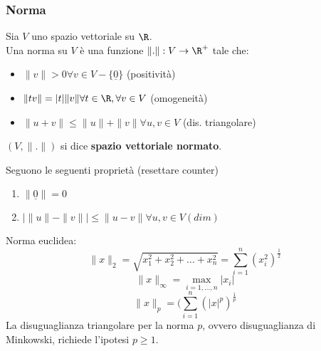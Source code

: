 \subsubsection{Norma}
\begin{tcolorbox}
	Sia $V$ uno spazio vettoriale su $\R$.
	\\Una norma su $V$ è una funzione $\|.\|:V\to \R^+$ tale che:
	\begin{itemize}
		\item $\|v\|>0\forall v\in V-\{\underline 0\} $ (positività)
		\item $\|tv\|=|t|\|v\|\forall t\in\R,\forall v\in V$ (omogeneità)
		\item $\|u+v\|\le \|u\|+\|v\|\forall u,v\in V$ (dis. triangolare)
	\end{itemize}
\end{tcolorbox}
\begin{tcolorbox}
	$(V,\|.\|)$ si dice \textbf{spazio vettoriale normato}.
\end{tcolorbox}
Seguono le seguenti proprietà (resettare counter)
\begin{enumerate}
	\item $\|\underline 0\|=0$
	\item $| \|u\|-\|v\| |\le \|u-v\|\forall u,v\in V (dim)$
\end{enumerate}
Norma euclidea:
\[\|x\|_2=\sqrt{x_1^2+x_2^2+\ldots+x_n^2} =\sum_{i=1}^{n} (x_i^2)^\frac{1}{2}\]
\[\|x\|_\infty=\max_{i=1,\ldots,n}|x_i|\]
\[\|x\|_p=(\sum_{i=1}^{n}(|x|^p)^{\frac{1}{p}}\]
La disuguaglianza triangolare per la norma $p$, ovvero disuguaglianza di Minkowski, richiede l'ipotesi $p\ge 1$.
